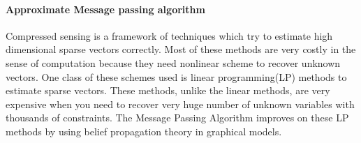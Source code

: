 \documentclass[12pt, leqno]{article}
\begin{document}
\paragraph{Approximate Message passing
  algorithm}

Compressed sensing is a framework of techniques which try to
estimate high dimensional sparse vectors correctly. Most of these
methods are very costly in the sense of computation because they need
nonlinear scheme to recover unknown vectors. One class of these
schemes used is linear programming(LP) methods to estimate sparse
vectors. These methods, unlike the linear methods, are very
expensive when you need to recover very huge number of
unknown variables with thousands of constraints. The Message Passing
Algorithm improves on these LP methods by using belief propagation theory in
graphical models.
\end{document}
